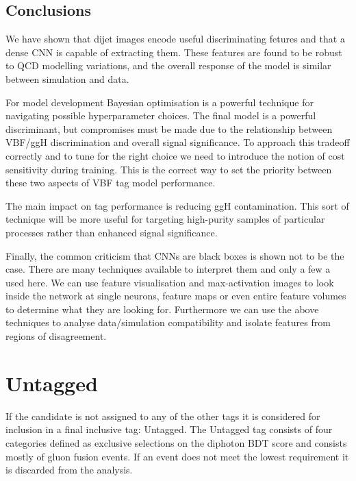 \subsection{Conclusions}
We have shown that dijet images encode useful discriminating fetures and that a dense CNN is capable of extracting them. These features are found to be robust to QCD modelling variations, and the overall response of the model is similar between simulation and data. 

For model development Bayesian optimisation is a powerful technique for navigating possible hyperparameter choices. The final model is a powerful discriminant, but compromises must be made due to the relationship between VBF/ggH discrimination and overall signal significance. 
To approach this tradeoff correctly and to tune for the right choice we need to introduce the notion of cost sensitivity during training. This is the correct way to set the priority between these two aspects of VBF tag model performance. 

The main impact on tag performance is reducing ggH contamination. This sort of technique will be more useful for targeting high-purity samples of particular processes rather than enhanced signal significance. 

Finally, the common criticism that CNNs are black boxes is shown not to be the case. There are many techniques available to interpret them and only a few a used here. We can use feature visualisation and max-activation images to look inside the network at single neurons, feature maps or even entire feature volumes to determine what they are looking for. 
Furthermore we can use the above techniques to analyse data/simulation compatibility and isolate features from regions of disagreement. 


\section{Untagged}
If the candidate is not assigned to any of the other tags it is considered for inclusion in a final inclusive tag: Untagged. 
The Untagged tag consists of four categories defined as exclusive selections on the diphoton BDT score and consists mostly of gluon fusion events. 
If an event does not meet the lowest requirement it is discarded from the analysis.






